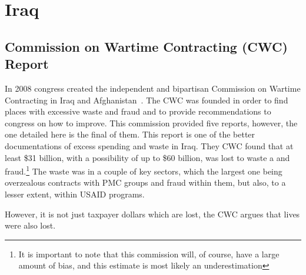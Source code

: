 \documentclass{article}
\begin{document}
\section{Iraq}
    \subsection{Commission on Wartime Contracting (CWC) Report}
        In 2008 congress created the independent and bipartisan Commission on Wartime Contracting in Iraq and Afghanistan~\cite{CWC_2011}. The CWC was founded in order to find places with excessive waste and fraud and to provide recommendations to congress on how to improve. This commission provided five reports, however, the one detailed here is the final of them. This report is one of the better documentations of excess spending and waste in Iraq. They CWC found that at least \$31 billion, with a possibility of up to \$60 billion, was lost to waste a and fraud.\footnote{It is important to note that this commission will, of course, have a large amount of bias, and this estimate is most likely an underestimation} The waste was in a couple of key sectors, which the largest one being overzealous contracts with PMC groups and fraud within them, but also, to a lesser extent, within USAID programs.

        However, it is not just taxpayer dollars which are lost, the CWC argues that lives were also lost. 
\end{document}
